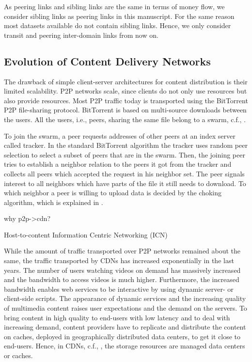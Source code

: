 As peering links and sibling links are the same in terms of money flow, we consider sibling links as peering links in this manuscript. For the same reason most datasets available do not contain sibling links.
Hence, we only consider transit and peering inter-domain links from now on.


\subsection{Evolution of Content Delivery Networks}

The drawback of simple client-server architectures for content distribution is their limited scalability.
P2P networks scale, since clients do not only use resources but also provide resources.
Most P2P traffic today is transported using the BitTorrent P2P file-sharing protocol.
BitTorrent is based on multi-source downloads between the users. All the users, i.e., peers, sharing the same file belong to a swarm, c.f., .

To join the swarm, a peer requests addresses of other peers at an index server called tracker.
In the standard BitTorrent algorithm the tracker uses random peer selection to select a subset of peers that are in the swarm.
Then, the joining peer tries to establish a neighbor relation to the peers it got from the tracker and collects all peers which accepted the request in his neighbor set.
The peer signals interest to all neighbors which have parts of the file it still needs to download.
To which neighbor a peer is willing to upload data is decided by the choking
algorithm, which is explained in \cite{cohen:bt}.


why p2p->cdn?

Host-to-content Information Centric Networking (ICN)

While the amount of traffic transported over P2P networks remained about the same, the traffic transported by CDNs has increased exponentially \cite{cisco2016} in the last years.
The number of users watching videos on demand has massively increased and the bandwidth to access videos is much higher.
Furthermore, the increased bandwidth enables web services to be interactive by using dynamic server- or client-side scripts.
The appearance of dynamic services and the increasing quality of multimedia content raises user expectations and the demand on the servers.
To bring content in high quality to end-users with low latency and to deal with increasing demand, content providers have to replicate and distribute the content on caches, deployed in geographically distributed data centers, to get it close to end-users.
Hence, in CDNs, c.f., , the storage resources are managed data centers or caches.

